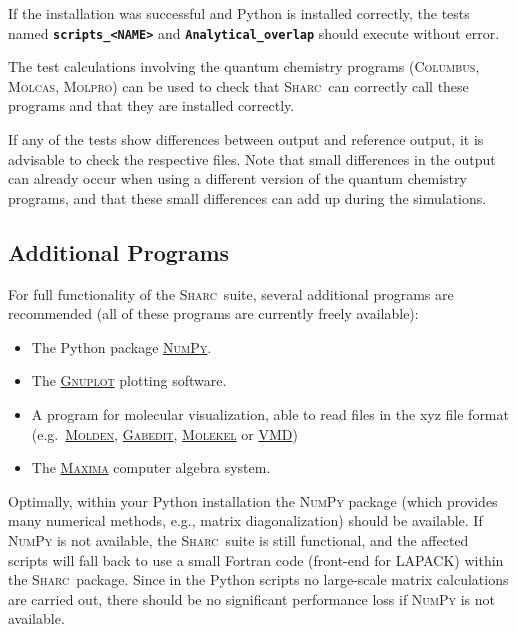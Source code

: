 \documentclass[a4paper,11pt,DIV=15,openany,twoside=false]{scrbook}
\newcommand{\sharc}{\textsc{Sharc}}
\newcommand{\ttt}[1]{\textbf{\texttt{#1}}}
\begin{document}
If the installation was successful and Python is installed correctly, the tests named \ttt{scripts\_<NAME>} and \ttt{Analytical\_overlap} should execute without error. 

The test calculations involving the quantum chemistry programs (\textsc{Columbus}, \textsc{Molcas}, \textsc{Molpro}) can be used to check that \sharc\ can correctly call these programs and that they are installed correctly.

If any of the tests show differences between output and reference output, it is advisable to check the respective files. Note that small differences in the output can already occur when using a different version of the quantum chemistry programs, and that these small differences can add up during the simulations.

\subsection{Additional Programs}

For full functionality of the \sharc\ suite, several additional programs are recommended (all of these programs are currently freely available):
\begin{itemize}
  \item The Python package \href{http://www.numpy.org/}{\textsc{NumPy}}.
  \item The \href{http://www.gnuplot.info/}{\textsc{Gnuplot}} plotting software.
  \item A program for molecular visualization, able to read files in the xyz file format (e.g.\ \href{http://www.cmbi.ru.nl/molden/molden.html}{\textsc{Molden}}, \href{http://gabedit.sourceforge.net/}{\textsc{Gabedit}}, \href{http://molekel.cscs.ch/wiki/pmwiki.php}{\textsc{Molekel}} or \href{http://www.ks.uiuc.edu/Research/vmd/}{VMD})
  \item The \href{http://maxima.sourceforge.net/}{\textsc{Maxima}} computer algebra system.
\end{itemize}

Optimally, within your Python installation the \textsc{NumPy} package (which provides many numerical methods, e.g., matrix diagonalization) should be available. If \textsc{NumPy} is not available, the \sharc\ suite is still functional, and the affected scripts will fall back to use a small Fortran code (front-end for LAPACK) within the \sharc\ package. Since in the Python scripts no large-scale matrix calculations are carried out, there should be no significant performance loss if \textsc{NumPy} is not available.
\end{document}
